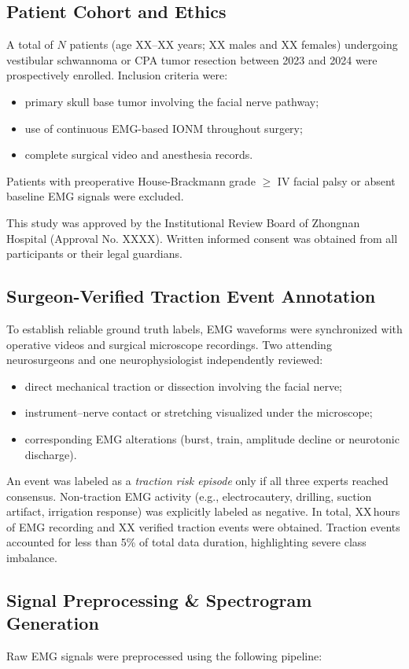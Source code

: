 \documentclass[10pt]{article}
\begin{document}
\subsection{Patient Cohort and Ethics}
A total of $N$ patients (age XX--XX years; XX males and XX females) undergoing vestibular schwannoma or CPA tumor resection between 2023 and 2024 were prospectively enrolled. Inclusion criteria were:
\begin{itemize}
    \item primary skull base tumor involving the facial nerve pathway;
    \item use of continuous EMG-based IONM throughout surgery;
    \item complete surgical video and anesthesia records.
\end{itemize}
Patients with preoperative House-Brackmann grade $\geq$ IV facial palsy or absent baseline EMG signals were excluded.

This study was approved by the Institutional Review Board of Zhongnan Hospital (Approval No. XXXX). Written informed consent was obtained from all participants or their legal guardians.

\subsection{Surgeon-Verified Traction Event Annotation}
To establish reliable ground truth labels, EMG waveforms were synchronized with operative videos and surgical microscope recordings. Two attending neurosurgeons and one neurophysiologist independently reviewed:
\begin{itemize}
    \item direct mechanical traction or dissection involving the facial nerve;
    \item instrument–nerve contact or stretching visualized under the microscope;
    \item corresponding EMG alterations (burst, train, amplitude decline or neurotonic discharge).
\end{itemize}
An event was labeled as a \textit{traction risk episode} only if all three experts reached consensus. Non-traction EMG activity (e.g., electrocautery, drilling, suction artifact, irrigation response) was explicitly labeled as negative. In total, XX\,hours of EMG recording and XX verified traction events were obtained. Traction events accounted for less than 5\% of total data duration, highlighting severe class imbalance.

\subsection{Signal Preprocessing \& Spectrogram Generation}
Raw EMG signals were preprocessed using the following pipeline:
\end{document}
